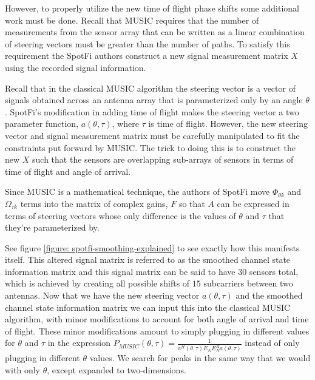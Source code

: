 \documentclass[12pt]{report}
\begin{document}
However, to properly utilize the new time of flight phase shifts some additional work must be done. Recall that MUSIC requires that the number of measurements from the sensor array that can be written as a linear combination of steering vectors must be greater than the number of paths. To satisfy this requirement the SpotFi authors construct a new signal measurement matrix $X$ using the recorded signal information. \par

Recall that in the classical MUSIC algorithm the steering vector is a vector of signals obtained across an antenna array that is parameterized only by an angle $\theta$. SpotFi's modification in adding time of flight makes the steering vector a two parameter function, $a(\theta, \tau)$, where $\tau$ is time of flight. However, the new steering vector and signal measurement matrix must be carefully manipulated to fit the constraints put forward by MUSIC. The trick to doing this is to construct the new $X$ such that the sensors are overlapping sub-arrays of sensors in terms of time of flight and angle of arrival. 


Since MUSIC is a mathematical technique, the authors of SpotFi move $\Phi_{\theta k}$ and $\Omega_{\tau k}$ terms into the matrix of complex gains, $F$ so that $A$ can be expressed in terms of steering vectors whose only difference is the values of $\theta$ and $\tau$ that they're parameterized by. 


See figure \ref{figure: spotfi-smoothing-explained} to see exactly how this manifests itself. This altered signal matrix is referred to as the smoothed channel state information matrix and this signal matrix can be said to have $30$ sensors total, which is achieved by creating all possible shifts of $15$ subcarriers between two antennas. Now that we have the new steering vector $a(\theta, \tau)$ and the smoothed channel state information matrix we can input this into the classical MUSIC algorithm, with minor modifications to account for both angle of arrival and time of flight. These minor modifications amount to simply plugging in different values for $\theta$ and $\tau$ in the expression $P_{MUSIC}(\theta, \tau) = \frac{1}{a^{H}(\theta, \tau) E_{N} E^{H}_{N} a(\theta, \tau)}$ instead of only plugging in different $\theta$ values. We search for peaks in the same way that we would with only $\theta$, except expanded to two-dimensions. \par
\end{document}

